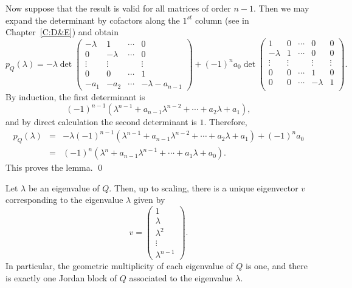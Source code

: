 \documentclass{ximera}
\begin{document}
Now suppose that the result is valid for all matrices of order $n-1$.  
Then we may expand the determinant by cofactors
 along the $1^{st}$ column (see  in 
Chapter~\ref{C:D&E}) and obtain 
{\small 
\[
p_Q(\lambda)  =  -\lambda \det\left(\begin{array}{cccc}
-\lambda & 1 &  \cdots & 0\\
0 & -\lambda &  \cdots & 0\\
\vdots & \vdots & & \vdots\\
0 & 0 & \cdots & 1\\
-a_1 & -a_2 & \cdots & -\lambda-a_{n-1}
\end{array}\right)
+(-1)^na_0\det\left(\begin{array}{ccccc}
1 & 0  & \cdots & 0 & 0\\
-\lambda &   1  & \cdots & 0 & 0\\
\vdots & \vdots & & \vdots & \vdots \\
0 & 0 & \cdots &  1  & 0\\
0 & 0 & \cdots & -\lambda & 1\\
\end{array}\right).
\]
}
By induction, the first determinant is 
\[
(-1)^{n-1}(\lambda^{n-1}+a_{n-1}\lambda^{n-2}+
\cdots+a_2\lambda+a_1),
\]
and by direct calculation the second determinant is $1$.  Therefore,
\begin{eqnarray*}
p_Q(\lambda) & = &
-\lambda (-1)^{n-1}(\lambda^{n-1}+a_{n-1}\lambda^{n-2}+
\cdots+a_2\lambda+a_1) +(-1)^n a_0 \\
& = & (-1)^n(\lambda^n+a_{n-1}\lambda^{n-1}+\cdots+a_1\lambda+a_0).
\end{eqnarray*}
This proves the lemma.   \qed

\begin{lemma}   \label{lem:ho2}
Let $\lambda$ be an eigenvalue of $Q$.  Then, up to scaling, there is a 
unique eigenvector $v$ corresponding to the eigenvalue $\lambda$ given by
\[
v = \left(\begin{array}{c}
1\\
\lambda\\
\lambda^2\\
\vdots\\
\lambda^{n-1}
\end{array}\right).
\]
In particular, the geometric 
multiplicity of each eigenvalue of $Q$ is 
one, and there is exactly one Jordan block 
of $Q$ associated to the eigenvalue $\lambda$.
\end{lemma}
\end{document}
